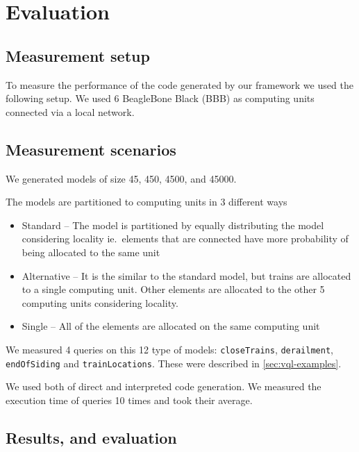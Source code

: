 
\chapter{Evaluation}


\section{Measurement setup}

To measure the performance of the code generated by our framework we used the following setup.
We used 6 BeagleBone Black (BBB) \cite{BBB} as computing units connected via a local network.

\section{Measurement scenarios}

We generated models of size 45, 450, 4500, and 45000.

The models are partitioned to computing units in 3 different ways 
\begin{itemize}
	\item Standard -- The model is partitioned by equally distributing the model considering locality ie.\ elements that are connected have more probability of being allocated to the same unit
	\item Alternative -- It is the similar to the standard model, but trains are allocated to a single computing unit. Other elements are allocated to the other 5 computing units considering locality.
	\item Single -- All of the elements are allocated on the same computing unit
\end{itemize}

We measured 4 queries on this 12 type of models: \texttt{closeTrains}, \texttt{derailment}, \texttt{endOfSiding} and \texttt{trainLocations}. 
These were described in \autoref{sec:vql-examples}.

We used both of direct and interpreted code generation.
We measured the execution time of queries 10 times and took their average.

\section{Results, and evaluation}

